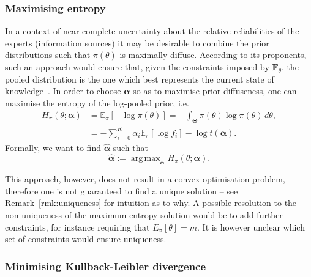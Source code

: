 \documentclass[a4paper, notitlepage, 11pt]{article}
\DeclareMathOperator*{\argmax}{arg\,max}
\begin{document}
\subsubsection{Maximising entropy}
\label{sec:maxent}

In a context of near complete uncertainty about the relative reliabilities of the experts (information sources) it may be desirable to combine the prior distributions such that $\pi(\theta)$ is maximally diffuse. %
According to its proponents, such an approach would ensure that, given the constraints imposed by $\mathbf{F}_{\theta}$, the pooled distribution is the one which best represents the current state of knowledge~\citep{Jaynes1957,Savchuk1994}.
In order to choose $\boldsymbol\alpha$ so as to maximise prior 
diffuseness, one can maximise the entropy of the log-pooled prior, i.e.
\begin{align}
\nonumber
H_{\pi}(\theta; \boldsymbol\alpha) &= \mathbb{E}_{\pi}\left[-\log \pi(\theta) \right] =-\int_{\boldsymbol\Theta}\pi(\theta)\log\pi(\theta)\, d\theta,\\
\label{eq:entropypiB}
&= -\sum_{i=0}^{K} \alpha_i \mathbb{E}_{\pi}[\log f_i] - \log t(\boldsymbol\alpha).
\end{align}
Formally, we want to find $\hat{\boldsymbol\alpha}$ such that
\begin{equation}
\label{eq:argmaxEnt}
 \hat{\boldsymbol\alpha}:= \argmax_{\boldsymbol\alpha} H_{\pi}(\theta; \boldsymbol\alpha).
\end{equation}

This approach, however, does not result in a convex optimisation problem, therefore one is not guaranteed to find a unique solution -- see Remark~\ref{rmk:uniqueness} for intuition as to why.
A possible resolution to the non-uniqueness of the maximum entropy solution would be to add further constraints, for instance requiring that $E_{\pi}[\theta] = m$.
It is however unclear which set of constraints would ensure uniqueness.

\subsubsection{Minimising Kullback-Leibler divergence}
\label{sec:minKL}
\end{document}
